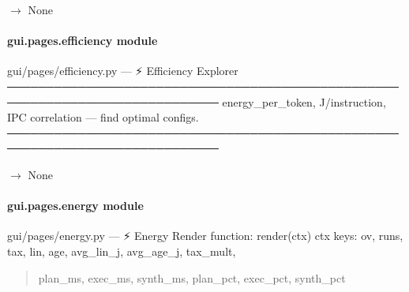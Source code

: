 \documentclass[letterpaper,10pt,english]{sphinxmanual}
\begin{document}
\begin{fulllineitems}
\label{\detokenize{gui.pages.dq_validity:gui.pages.dq_validity.render}}
\pysigstartsignatures
\pysiglinewithargsret
{}
{}
{{ $\rightarrow$ None}}
\pysigstopsignatures
\end{fulllineitems}


\sphinxstepscope


\paragraph{gui.pages.efficiency module}
\label{\detokenize{gui.pages.efficiency:module-gui.pages.efficiency}}\label{\detokenize{gui.pages.efficiency:gui-pages-efficiency-module}}\label{\detokenize{gui.pages.efficiency::doc}}
\sphinxAtStartPar
gui/pages/efficiency.py  —  ⚡  Efficiency Explorer
─────────────────────────────────────────────────────────────────────────────
energy\_per\_token, J/instruction, IPC correlation — find optimal configs.
─────────────────────────────────────────────────────────────────────────────

\begin{fulllineitems}
\label{\detokenize{gui.pages.efficiency:gui.pages.efficiency.render}}
\pysigstartsignatures
\pysiglinewithargsret
{}
{}
{{ $\rightarrow$ None}}
\pysigstopsignatures
\end{fulllineitems}


\sphinxstepscope


\paragraph{gui.pages.energy module}
\label{\detokenize{gui.pages.energy:module-gui.pages.energy}}\label{\detokenize{gui.pages.energy:gui-pages-energy-module}}\label{\detokenize{gui.pages.energy::doc}}
\sphinxAtStartPar
gui/pages/energy.py  —  ⚡  Energy
Render function: render(ctx)
ctx keys: ov, runs, tax, lin, age, avg\_lin\_j, avg\_age\_j, tax\_mult,
\begin{quote}

\sphinxAtStartPar
plan\_ms, exec\_ms, synth\_ms, plan\_pct, exec\_pct, synth\_pct
\end{quote}
\end{document}
